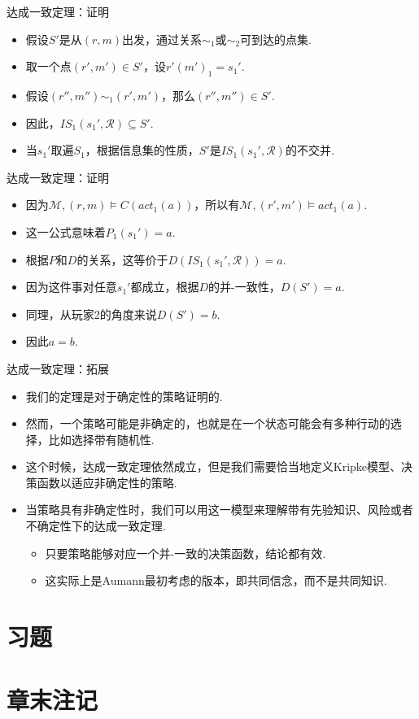 \begin{frame}{达成一致定理：证明}
\begin{itemize}
    \item 假设$S'$是从$(r,m)$出发，通过关系$\sim_1$或$\sim_2$可到达的点集.
    \item 取一个点$(r',m')\in S'$，设$r'(m')_1=s_1'$.
    \item 假设$(r'',m'')\sim_1(r',m')$，那么$(r'',m'')\in S'$.
    \item 因此，$IS_1(s_1',\mathcal R)\subseteq S'$.
    \item 当$s_1'$取遍$S_1$，根据信息集的性质，$S'$是$IS_1(s_1',\mathcal R)$的不交并.
\end{itemize}
\end{frame}

\begin{frame}{达成一致定理：证明}
\begin{itemize}
    \item 因为$\mathcal M,(r,m)\vDash C(act_1(a))$，所以有$\mathcal M,(r',m')\vDash act_1(a)$.
    \item 这一公式意味着$P_1(s_1')=a$.
    \item 根据$P$和$D$的关系，这等价于$D(IS_1(s_1',\mathcal R))=a$.
    \item 因为这件事对任意$s_1'$都成立，根据$D$的并-一致性，$D(S')=a$.
    \item 同理，从玩家2的角度来说$D(S')=b$.
    \item 因此$a=b$.
\end{itemize}
\end{frame}

\begin{frame}{达成一致定理：拓展}
\begin{itemize}
    \item 我们的定理是对于确定性的策略证明的.
    \item 然而，一个策略可能是非确定的，也就是在一个状态可能会有多种行动的选择，比如选择带有随机性.
    \item 这个时候，达成一致定理依然成立，但是我们需要恰当地定义Kripke模型、决策函数以适应非确定性的策略.
    \item 当策略具有非确定性时，我们可以用这一模型来理解带有先验知识、风险或者不确定性下的达成一致定理.
    \begin{itemize}
        \item 只要策略能够对应一个并-一致的决策函数，结论都有效.
        \item 这实际上是Aumann最初考虑的版本，即共同信念，而不是共同知识.
    \end{itemize}
\end{itemize}
\end{frame}

\section{习题}

\section{章末注记}